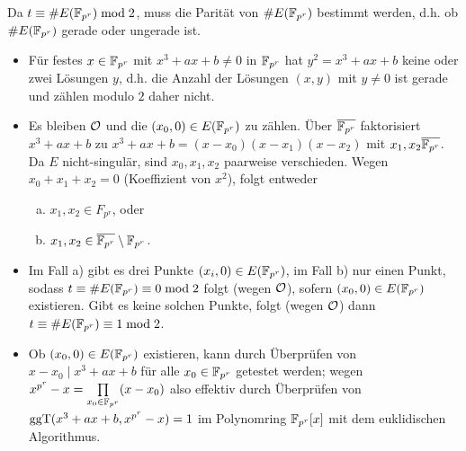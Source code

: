 \begin{anw}
	Da $t \equiv \#E(\mathbb{F}_{p^r}) \bmod 2$, muss die Parität von $\#E(\mathbb{F}_{p^r})$ bestimmt werden, d.h. ob $\#E(\mathbb{F}_{p^r})$ gerade oder ungerade ist.
	\begin{itemize}
		\item Für festes $x \in \mathbb{F}_{p^r}$ mit $x^3 + ax + b \neq 0$ in $\mathbb{F}_{p^r}$ hat $y^2 = x^3 + ax + b$ keine oder zwei Lösungen $y$, d.h. die Anzahl der Lösungen $(x,y)$ mit $y \neq 0$ ist gerade und zählen modulo $2$ daher nicht.
		\item Es bleiben $\mathcal{O}$ und die $(x_0,0) \in E(\mathbb{F}_{p^r})$ zu zählen.
		Über $\overline{\mathbb{F}_{p^r}}$ faktorisiert $x^3 + ax + b$ zu $x^3 + ax + b = (x-x_0)(x-x_1)(x-x_2)$ mit $x_1, x_2 \overline{\mathbb{F}_{p^r}}$.
		Da $E$ nicht-singulär, sind $x_0,x_1,x_2$ paarweise verschieden.
		Wegen $x_0+x_1+x_2 = 0$ (Koeffizient von $x^2$), folgt entweder
		\begin{enumerate}[a)]
			\item $x_1,x_2 \in F_{p^r}$, oder
			\item $x_1,x_2 \in \overline{\mathbb{F}_{p^r}} \setminus \mathbb{F}_{p^r}$.
		\end{enumerate}
		\item Im Fall a) gibt es drei Punkte $(x_i,0) \in E(\mathbb{F}_{p^r})$, im Fall b) nur einen Punkt, sodass $t \equiv \#E(\mathbb{F}_{p^r}) \equiv 0 \bmod 2$ folgt (wegen $\mathcal{O}$), sofern $(x_0,0) \in E(\mathbb{F}_{p^r})$ existieren.
		Gibt es keine solchen Punkte, folgt (wegen $\mathcal{O}$) dann $t \equiv \#E(\mathbb{F}_{p^r}) \equiv 1 \bmod 2$.
		\item Ob $(x_0,0) \in E(\mathbb{F}_{p^r})$ existieren, kann durch Überprüfen von $x-x_0 \mid x^3 + ax + b$ für alle $x_0 \in \mathbb{F}_{p^r}$ getestet werden; wegen $x^{p^r} - x = \prod\limits_{x_0 \in \mathbb{F}_{p^r}} (x-x_0)$ also effektiv durch Überprüfen von $\operatorname{ggT}(x^3 + ax + b, x^{p^r} - x) = 1$ im Polynomring $\mathbb{F}_{p^r}[x]$ mit dem euklidischen Algorithmus.
	\end{itemize}
\end{anw}

